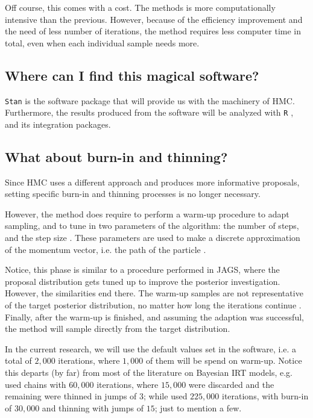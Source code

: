 Off course, this comes with a cost. The methods is more computationally intensive than the previous. However, because of the efficiency improvement and the need of less number of iterations, the method requires less computer time in total, even when each individual sample needs more.


\subsection{Where can I find this magical software?}

\texttt{Stan} \cite{Stan2020} is the software package that will provide us with the machinery of HMC. Furthermore, the results produced from the software will be analyzed with \texttt{R} \cite{R2015, RStan2020}, and its integration packages. 


\subsection{What about burn-in and thinning?}

Since HMC uses a different approach and produces more informative proposals, setting specific burn-in and thinning processes is no longer necessary.

However, the method does require to perform a warm-up procedure to adapt sampling, and to tune in two parameters of the algorithm: the number of steps, and the step size \cite{Stan2020}. These parameters are used to make a discrete approximation of the momentum vector, i.e. the path of the particle \cite{Neal_2011, Betancourt_et_al_2013}. 

Notice, this phase is similar to a procedure performed in JAGS, where the proposal distribution gets tuned up to improve the posterior investigation. However, the similarities end there. The warm-up samples are not representative of the target posterior distribution, no matter how long the iterations continue \cite{McElreath_2020}. Finally, after the warm-up is finished, and assuming the adaption was successful, the method will sample directly from the target distribution.

In the current research, we will use the default values set in the software, i.e. a total of $2,000$ iterations, where $1,000$ of them will be spend on warm-up. Notice this departs (by far) from most of the literature on Bayesian IRT models, e.g. \citet{Fujimoto_2018a} used chains with $60,000$ iterations, where $15,000$ were discarded and the remaining were thinned in jumps of $3$; while \citet{Fujimoto_2018b} used $225,000$ iterations, with burn-in of $30,000$ and thinning with jumps of $15$; just to mention a few.


